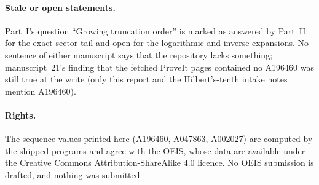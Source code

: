 \documentclass[11pt]{article}
\theoremstyle{definition}
\theoremstyle{remark}
\begin{document}
\paragraph{Stale or open statements.} Part~I's question ``Growing
truncation order'' is marked as answered by Part~II for the exact sector
tail and open for the logarithmic and inverse expansions. No sentence of
either manuscript says that the repository lacks something; manuscript~21's
finding that the fetched ProveIt pages contained no A196460 was still true
at the write (only this report and the Hilbert's-tenth intake notes
mention A196460).

\paragraph{Rights.} The sequence values printed here (A196460, A047863,
A002027) are computed by the shipped programs and agree with the OEIS,
whose data are available under the Creative Commons Attribution-ShareAlike
4.0 licence. No OEIS submission is drafted, and nothing was submitted.
\end{document}
